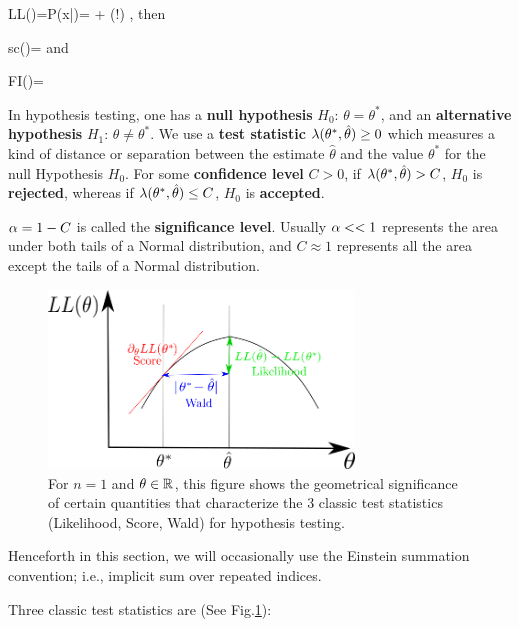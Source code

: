 \beq
LL(\theta)=\ln P(x|\theta)=
  + \caln(!\theta)
\;,
\label{eq-normal-ll}
\eeq
then

\beq
sc(\theta)=
\eeq
and

\beq
FI(\theta)=
\eeq



In hypothesis testing, one has
 a {\bf null hypothesis}
$H_0$: $\theta=\theta^*$,
and an {\bf alternative hypothesis}
 $H_1$: $\theta\neq \theta^*$.
We use a {\bf test statistic}
$\lambda(\theta^*, \hat{\theta})\geq 0$
which 
measures a kind of
distance or separation between the
estimate $\hat{\theta}$
and 
the value $\theta^*$
for the null Hypothesis $H_0$.
For some {\bf confidence level} $C>0$,
if $\lambda(\theta^*, \hat{\theta})> C$,
$H_0$ is {\bf rejected}, whereas
if $\lambda(\theta^*, \hat{\theta})\leq C$,
$H_0$ is {\bf accepted}.


$\alpha=1-C$ is called the 
{\bf significance level}.
Usually $\alpha<<1$
represents
the area under both 
tails
of a Normal
distribution,
 and $C\approx 1$
represents
all the area except the tails of a 
Normal distribution.

\begin{figure}[h!]
\centering
\includegraphics[width=3.2in]{conventions/classic-trio.png}
\caption{For $n=1$ and $\theta\in{ \mathbb{R}}$,
this figure shows the geometrical significance of
certain
quantities that
characterize the
3 classic test statistics
(Likelihood, Score, Wald)
for hypothesis testing.} 
\label{fig-classic-trio}
\end{figure}

Henceforth in this section,
we will 
occasionally  use the 
Einstein summation
convention; i.e., implicit sum over
repeated indices.

Three classic test statistics 
are (See Fig.\ref{fig-classic-trio}):

